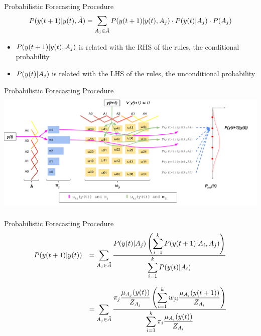 \documentclass{beamer}
\begin{document}
\begin{frame}{Probabilistic Forecasting Procedure}
\linespread{2}
$$P(y(t+1)|y(t),\tilde{A}) = \sum_{A_j \in \tilde{A}} P(y(t+1)|y(t),A_j)\cdot P(y(t)|A_j)\cdot P(A_j)$$
\begin{itemize}
    \item $P(y(t+1)|y(t),A_j)$ is related with the RHS of the rules, the conditional probability 
    \item $P(y(t)|A_j)$ is related with the LHS of the rules, the unconditional probability
\end{itemize}
\end{frame}



\begin{frame}{Probabilistic Forecasting Procedure}
\includegraphics[width=1.1\textwidth,height=6cm]{figures/pwfts_probabilistic_forecasting.pdf}
\end{frame}



\begin{frame}{Probabilistic Forecasting Procedure}
\begin{equation}
\begin{array}{cl}
P(y(t+1) | y(t)) &=  \displaystyle \sum_{A_j \in  \tilde{A}}\frac{\displaystyle P(y(t)| A_j) \left( \sum_{i = 1}^k  P(y(t+1) | A_i,A_j) \right)}{\displaystyle \sum_{i = 1}^k P(y(t)| A_i)}  \\
& \\
 &= \displaystyle \sum_{A_j \in  \tilde{A}} \frac{ \displaystyle  \pi_j\frac{\mu_{A_j}(y(t))}{Z_{A_j}} \left( \sum_{i = 1}^k  w_{ji}\frac{\mu_{A_i}(y(t+1))}{Z_{A_i}} \right)}{\displaystyle \sum_{i = 1}^k \pi_i\frac{\mu_{A_i}(y(t))}{Z_{A_i}}}
\end{array}
\label{eqn:pwfts_probabilistic}
\end{equation}
\end{frame}
\end{document}
